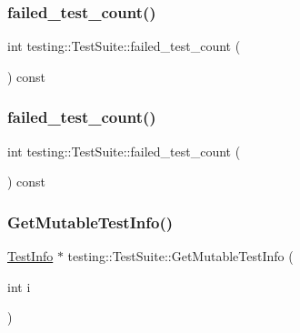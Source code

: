 \subsubsection{\texorpdfstring{failed\_test\_count()}{failed\_test\_count()}\hspace{0.1cm}{\footnotesize\ttfamily [1/2]}}
{\footnotesize\ttfamily int testing\+::\+Test\+Suite\+::failed\+\_\+test\+\_\+count (\begin{DoxyParamCaption}{ }\end{DoxyParamCaption}) const}

\mbox{\label{classtesting_1_1_test_suite_aaf18223e67cf0761f56bd4b8167abc6c}} 
\subsubsection{\texorpdfstring{failed\_test\_count()}{failed\_test\_count()}\hspace{0.1cm}{\footnotesize\ttfamily [2/2]}}
{\footnotesize\ttfamily int testing\+::\+Test\+Suite\+::failed\+\_\+test\+\_\+count (\begin{DoxyParamCaption}{ }\end{DoxyParamCaption}) const}

\mbox{\label{classtesting_1_1_test_suite_a8d95ac13939d4e89987cf6cbf57b0b46}} 
\subsubsection{\texorpdfstring{GetMutableTestInfo()}{GetMutableTestInfo()}\hspace{0.1cm}{\footnotesize\ttfamily [1/2]}}
{\footnotesize\ttfamily \mbox{\hyperlink{classtesting_1_1_test_info}{Test\+Info}} $\ast$ testing\+::\+Test\+Suite\+::\+Get\+Mutable\+Test\+Info (\begin{DoxyParamCaption}\item[{int}]{i }\end{DoxyParamCaption})\hspace{0.3cm}{\ttfamily [private]}}

